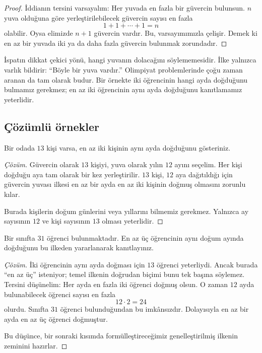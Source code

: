 \begin{proof}
İddianın tersini varsayalım: Her yuvada en fazla bir güvercin bulunsun. $n$ yuva olduğuna göre yerleştirilebilecek güvercin sayısı en fazla
\[
1+1+\cdots+1=n
\]
olabilir. Oysa elimizde $n+1$ güvercin vardır. Bu, varsayımımızla çelişir. Demek ki en az bir yuvada iki ya da daha fazla güvercin bulunmak zorundadır.
\end{proof}

İspatın dikkat çekici yönü, hangi yuvanın dolacağını söylememesidir. İlke yalnızca varlık bildirir: ``Böyle bir yuva vardır.'' Olimpiyat problemlerinde çoğu zaman aranan da tam olarak budur. Bir örnekte iki öğrencinin hangi ayda doğduğunu bulmamız gerekmez; en az iki öğrencinin aynı ayda doğduğunu kanıtlamamız yeterlidir.

\subsection{Çözümlü örnekler}

\begin{example}
Bir odada $13$ kişi varsa, en az iki kişinin aynı ayda doğduğunu gösteriniz.
\end{example}
\begin{proof}[Çözüm]
Güvercin olarak $13$ kişiyi, yuva olarak yılın $12$ ayını seçelim. Her kişi doğduğu aya tam olarak bir kez yerleştirilir. $13$ kişi, $12$ aya dağıtıldığı için güvercin yuvası ilkesi en az bir ayda en az iki kişinin doğmuş olmasını zorunlu kılar.

Burada kişilerin doğum günlerini veya yıllarını bilmemiz gerekmez. Yalnızca ay sayısının $12$ ve kişi sayısının $13$ olması yeterlidir.
\end{proof}

\begin{example}
Bir sınıfta $31$ öğrenci bulunmaktadır. En az üç öğrencinin aynı doğum ayında doğduğunu bu ilkeden yararlanarak kanıtlayınız.
\end{example}
\begin{proof}[Çözüm]
İki öğrencinin aynı ayda doğması için $13$ öğrenci yeterliydi. Ancak burada ``en az üç'' isteniyor; temel ilkenin doğrudan biçimi bunu tek başına söylemez. Tersini düşünelim: Her ayda en fazla iki öğrenci doğmuş olsun. O zaman $12$ ayda bulunabilecek öğrenci sayısı en fazla
\[
12\cdot2=24
\]
olurdu. Sınıfta $31$ öğrenci bulunduğundan bu imkânsızdır. Dolayısıyla en az bir ayda en az üç öğrenci doğmuştur.

Bu düşünce, bir sonraki kısımda formülleştireceğimiz genelleştirilmiş ilkenin zeminini hazırlar.
\end{proof}


